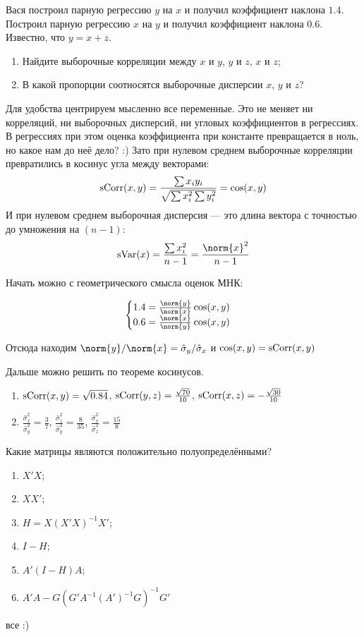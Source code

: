\begin{problem}
Вася построил парную регрессию $y$ на $x$ и получил коэффициент наклона $1.4$. Построил парную регрессию $x$ на $y$ и получил коэффициент наклона $0.6$. Известно, что $y=x+z$.
\begin{enumerate}
    \item Найдите выборочные корреляции между $x$ и $y$, $y$ и $z$, $x$ и $z$;
    \item В какой пропорции соотносятся выборочные дисперсии $x$, $y$ и $z$?
\end{enumerate}
\begin{sol}
Для удобства центрируем мысленно все переменные. Это не меняет ни корреляций,
ни выборочных дисперсий, ни угловых коэффициентов в регрессиях.
В регрессиях при этом оценка коэффициента при константе превращается в ноль, но какое нам до неё дело? :)
Зато при нулевом среднем выборочные корреляции превратились в косинус угла между векторами:
\[
\operatorname{sCorr}(x,y) = \frac{\sum x_i y_i}{ \sqrt{\sum x_i^2 \sum y_i^2}} = \cos(x, y)
\]
И при нулевом среднем выборочная дисперсия — это длина вектора с точностью до умножения на $(n-1)$:
\[
\sVar(x) = \frac{\sum x_i^2}{n-1} = \frac{\norm{x}^2}{n-1}
\]

Начать можно с геометрического смысла оценок МНК:

\[
\begin{cases}
1.4 = \frac{\norm{y}}{\norm{x}}\cos(x, y) \\
0.6 = \frac{\norm{x}}{\norm{y}}\cos(x, y) \\
\end{cases}
\]

Отсюда находим $\norm{y}/\norm{x} = \hat{\sigma}_y / \hat{\sigma}_x$ и $\cos(x,y)=\operatorname{sCorr}(x,y)$

Дальше можно решить по теореме косинусов.

\begin{enumerate}
\item $\operatorname{sCorr}(x,y) = \sqrt{0.84}$, $\operatorname{sCorr}(y,z) = \frac{\sqrt{70}}{10}$,
$\operatorname{sCorr}(x,z) = -\frac{\sqrt{30}}{10}$
\item $\frac{\hat{\sigma}_x^2}{\hat{\sigma}_y^2} = \frac{3}{7}$,
$\frac{\hat{\sigma}_z^2}{\hat{\sigma}_y^2} = \frac{8}{35}$,
$\frac{\hat{\sigma}_x^2}{\hat{\sigma}_z^2} = \frac{15}{8}$
\end{enumerate}
\end{sol}
\end{problem}


\begin{problem}
Какие матрицы являются положительно полуопределёнными?

\begin{enumerate}
  \item $X'X$;
  \item $XX'$;
  \item $H = X(X'X)^{-1}X'$;
  \item $I - H$;
  \item $A'(I-H)A$;
  \item $A'A - G(G'A^{-1}(A')^{-1}G)^{-1}G'$
\end{enumerate}
  \begin{sol}
    все :)
  \end{sol}
\end{problem}

